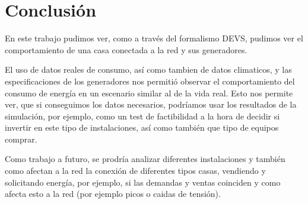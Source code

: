 \section{Conclusión}
En este trabajo pudimos ver, como a través del formalismo DEVS, pudimos ver el comportamiento de una
casa conectada a la red y sus generadores.

El uso de datos reales de consumo, así como tambien de datos climaticos, y las especificaciones de los
generadores nos permitió observar el comportamiento del consumo de energía en un escenario similar al
de la vida real. Esto nos permite ver, que si conseguimos los datos necesarios, podríamos usar los 
resultados de la simulación, por ejemplo, como un test de factibilidad a la hora de decidir si invertir
en este tipo de instalaciones, así como también que tipo de equipos comprar.

Como trabajo a futuro, se prodría analizar diferentes instalaciones y también como afectan a la red 
la conexión de diferentes tipos casas, vendiendo y solicitando energía, por ejemplo, si las demandas y 
ventas coinciden y como afecta esto a la red (por ejemplo picos o caidas de tensión).